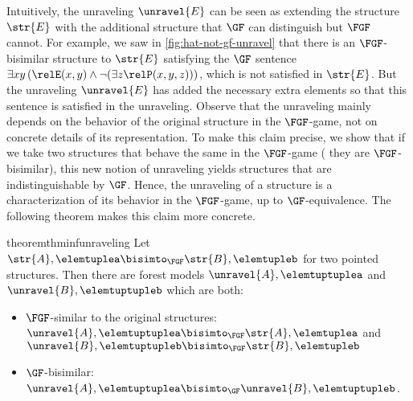 Intuitively, the unraveling $\unravel{E}$ can be seen as extending the structure $\str{E}$ with the additional structure that $\GF$ can distinguish but $\FGF$ cannot.
For example, we saw in \cref{fig:hat-not-gf-unravel} that there is an $\FGF$-bisimilar structure to $\str{E}$ satisfying the $\GF$ sentence $\exists{xy}\,(\relE(x,y) \land \lnot (\exists z \relP(x,y,z)))$, which is not satisfied in $\str{E}$.
But the unraveling $\unravel{E}$ has added the necessary extra elements so that this sentence is satisfied in the unraveling.
Observe that the unraveling mainly depends on the behavior of the original structure in the $\FGF$-game, not on concrete details of its representation.
To make this claim precise, we show that if we take two structures that behave the same in the $\FGF$-game (\ie{} they are $\FGF$-bisimilar), this new notion of unraveling yields structures that are indistinguishable by $\GF$.
Hence, the unraveling of a structure is a characterization of its behavior in the $\FGF$-game, up to $\GF$-equivalence. The following theorem makes this claim more concrete.
\begin{restatable}{theorem}{thminfunraveling}\label{thm:inf-unraveling-upgrading}
  Let $\str{A}, \elemtuplea \bisimto_{\FGF} \str{B}, \elemtupleb$ for two pointed structures.
  Then there are forest models $\unravel{A}, \elemtuptuplea$ and $\unravel{B}, \elemtuptupleb$ which are both:
  \begin{itemize}
    \item $\FGF$-similar to the original structures: $\unravel{A}, \elemtuptuplea \bisimto_{\FGF} \str{A}, \elemtuplea$ and $\unravel{B}, \elemtuptupleb \bisimto_{\FGF} \str{B}, \elemtupleb$
    \item $\GF$-bisimilar: $\unravel{A}, \elemtuptuplea \bisimto_{\GF} \unravel{B}, \elemtuptupleb$.
  \end{itemize}
\end{restatable}
